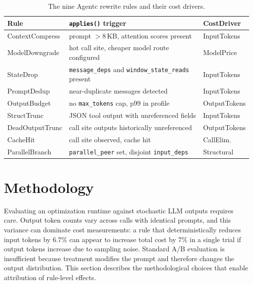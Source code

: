 \begin{table}[t]
\caption{The nine Agentc rewrite rules and their cost drivers.}
\label{tab:rules}
\footnotesize
\begin{tabularx}{\columnwidth}{@{} l X l @{}}
\toprule
Rule & \texttt{applies()} trigger & CostDriver \\
\midrule
ContextCompress  & prompt $>$8\,KB, attention scores present       & InputTokens \\
ModelDowngrade   & hot call site, cheaper model route configured   & ModelPrice \\
StateDrop        & \texttt{message\_deps} and \texttt{window\_state\_\allowbreak reads} present & InputTokens \\
PromptDedup      & near-duplicate messages detected                & InputTokens \\
OutputBudget     & no \texttt{max\_tokens} cap, p99 in profile     & OutputTokens \\
StructTrunc      & JSON tool output with unreferenced fields       & InputTokens \\
DeadOutputTrunc  & call site outputs historically unreferenced     & OutputTokens \\
CacheHit         & call site observed, cache hit                   & CallElim. \\
ParallelBranch   & \texttt{parallel\_peer} set, disjoint \texttt{input\_deps} & Structural \\
\bottomrule
\end{tabularx}
\end{table}

\section{Methodology}
\label{sec:methodology}

Evaluating an optimization runtime against stochastic LLM outputs requires care.
Output token counts vary across calls with identical prompts, and this variance can
dominate cost measurements: a rule that deterministically reduces input tokens by
6.7\% can appear to increase total cost by 7\% in a single trial if output tokens
increase due to sampling noise. Standard A/B evaluation is insufficient because
treatment modifies the prompt and therefore changes the output distribution. This
section describes the methodological choices that enable attribution of rule-level
effects.

